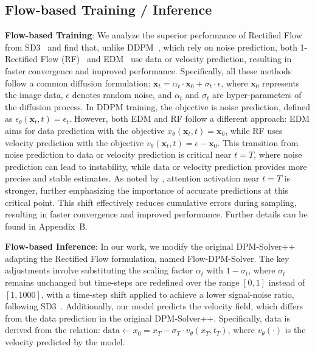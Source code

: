 

\subsection{Flow-based Training / Inference} \label{flow_schedule_train}

\noindent \textbf{Flow-based Training}: We analyze the superior performance of Rectified Flow from SD3~\citep{esser2024scaling} and find that, unlike DDPM~\citep{ho2020denoising}, which rely on noise prediction, both 1-Rectified Flow (RF)~\citep{lipman2022flow} and EDM~\citep{karras2022elucidating} use data or velocity prediction, resulting in faster convergence and improved performance. Specifically, all these methods follow a common diffusion formulation: $\mathbf{x}_t = \alpha_t \cdot \mathbf{x}_0 + \sigma_t \cdot \epsilon$, where $\mathbf{x}_0$ represents the image data, $\epsilon$ denotes random noise, and $\alpha_t$ and $\sigma_t$ are hyper-parameters of the diffusion process. In DDPM training, the objective is noise prediction, defined as $\epsilon_\theta(\mathbf{x}_t, t) = \epsilon_t$.
However, both EDM and RF follow a different approach: EDM aims for data prediction with the objective $x_\theta(\mathbf{x}_t, t) = \mathbf{x}_0$, while RF uses velocity prediction with the objective $v_\theta (\mathbf{x}_t, t) = \epsilon - \mathbf{x}_0$. 
This transition from noise prediction to data or velocity prediction is critical near $t = T$, where noise prediction can lead to instability, while data or velocity prediction provides more precise and stable estimates. As noted by \cite{balaji2022ediff}, attention activation near $t = T$ is stronger, further emphasizing the importance of accurate predictions at this critical point. This shift effectively reduces cumulative errors during sampling, resulting in faster convergence and improved performance. Further details can be found in Appendix~B.

\noindent \textbf{Flow-based Inference}: 
In our work, we modify the original DPM-Solver++~\citep{lu2022dpm_add} adapting the Rectified Flow formulation, named Flow-DPM-Solver. 
The key adjustments involve substituting the scaling factor $\alpha_t$ with $1 - \sigma_t$, where $\sigma_t$ remains unchanged but time-steps are redefined over the range $[0, 1]$ instead of $[1, 1000]$, 
with a time-step shift applied to achieve a lower signal-noise ratio, following SD3~\citep{esser2024scaling}. 
Additionally, our model predicts the velocity field, which differs from the data prediction in the original DPM-Solver++.
Specifically, data is derived from the relation: 
$\text{data} \gets x_0 = x_{T} - {\sigma}_{T} \cdot v_{\theta}(x_T, t_T)$,
where $v_\theta(\cdot)$ is the velocity predicted by the model.

